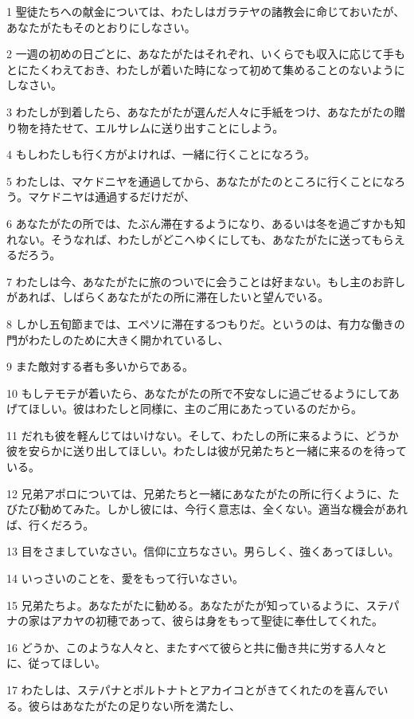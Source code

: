 \par 1 聖徒たちへの献金については、わたしはガラテヤの諸教会に命じておいたが、あなたがたもそのとおりにしなさい。
\par 2 一週の初めの日ごとに、あなたがたはそれぞれ、いくらでも収入に応じて手もとにたくわえておき、わたしが着いた時になって初めて集めることのないようにしなさい。
\par 3 わたしが到着したら、あなたがたが選んだ人々に手紙をつけ、あなたがたの贈り物を持たせて、エルサレムに送り出すことにしよう。
\par 4 もしわたしも行く方がよければ、一緒に行くことになろう。
\par 5 わたしは、マケドニヤを通過してから、あなたがたのところに行くことになろう。マケドニヤは通過するだけだが、
\par 6 あなたがたの所では、たぶん滞在するようになり、あるいは冬を過ごすかも知れない。そうなれば、わたしがどこへゆくにしても、あなたがたに送ってもらえるだろう。
\par 7 わたしは今、あなたがたに旅のついでに会うことは好まない。もし主のお許しがあれば、しばらくあなたがたの所に滞在したいと望んでいる。
\par 8 しかし五旬節までは、エペソに滞在するつもりだ。というのは、有力な働きの門がわたしのために大きく開かれているし、
\par 9 また敵対する者も多いからである。
\par 10 もしテモテが着いたら、あなたがたの所で不安なしに過ごせるようにしてあげてほしい。彼はわたしと同様に、主のご用にあたっているのだから。
\par 11 だれも彼を軽んじてはいけない。そして、わたしの所に来るように、どうか彼を安らかに送り出してほしい。わたしは彼が兄弟たちと一緒に来るのを待っている。
\par 12 兄弟アポロについては、兄弟たちと一緒にあなたがたの所に行くように、たびたび勧めてみた。しかし彼には、今行く意志は、全くない。適当な機会があれば、行くだろう。
\par 13 目をさましていなさい。信仰に立ちなさい。男らしく、強くあってほしい。
\par 14 いっさいのことを、愛をもって行いなさい。
\par 15 兄弟たちよ。あなたがたに勧める。あなたがたが知っているように、ステパナの家はアカヤの初穂であって、彼らは身をもって聖徒に奉仕してくれた。
\par 16 どうか、このような人々と、またすべて彼らと共に働き共に労する人々とに、従ってほしい。
\par 17 わたしは、ステパナとポルトナトとアカイコとがきてくれたのを喜んでいる。彼らはあなたがたの足りない所を満たし、
